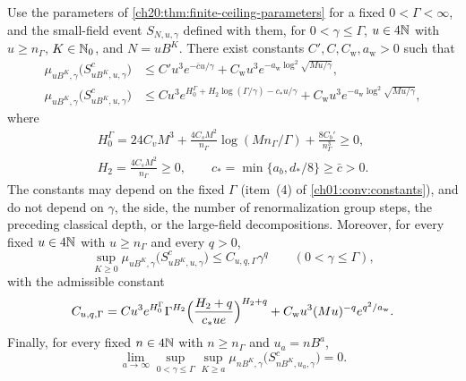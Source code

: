 \begin{theorem}\label{ch20:thm:finite-ceiling-payment}
Use the parameters of \cref{ch20:thm:finite-ceiling-parameters} for a fixed $0<\Gamma<\infty$, and the small-field event $S_{N,u,\gamma}$ defined with them, for $0<\gamma\le\Gamma$, $u\in4\mathbb N$ with $u\ge n_\Gamma$, $K\in\mathbb N_0$, and $N=uB^K$. There exist constants $C',C,C_{\mathrm w},a_{\mathrm w}>0$ such that
\begin{align}
 \mu_{uB^K,\gamma}\bigl(S_{uB^K,u,\gamma}^c\bigr)
 &\le C'u^3e^{-\bar cu/\gamma}+C_{\mathrm w}u^3e^{-a_{\mathrm w}\log^2\sqrt{Mu/\gamma}},
 \label{ch20:eq:finite-ceiling-absorbed}\\
 \mu_{uB^K,\gamma}\bigl(S_{uB^K,u,\gamma}^c\bigr)
 &\le Cu^3e^{H_0^\Gamma+H_2\log(\Gamma/\gamma)-c_*u/\gamma}+C_{\mathrm w}u^3e^{-a_{\mathrm w}\log^2\sqrt{Mu/\gamma}},
 \label{ch20:eq:finite-ceiling-unabsorbed}
\end{align}
where
\[
 \begin{gathered}
 H_0^\Gamma=24C_vM^3+\frac{4C_sM^2}{n_\Gamma}\log(Mn_\Gamma/\Gamma)+\frac{8C_b'}{n_\Gamma^3}\ge0,\\
 H_2=\frac{4C_sM^2}{n_\Gamma}\ge0,\qquad c_*=\min\{a_b,d_*/8\}\ge\bar c>0.
 \end{gathered}
\]
The constants may depend on the fixed $\Gamma$ (item~\textup{(4)} of \cref{ch01:conv:constants}), and do not depend on $\gamma$, the side, the number of renormalization group steps, the preceding classical depth, or the large-field decompositions. Moreover, for every fixed $u\in4\mathbb N$ with $u\ge n_\Gamma$ and every $q>0$,
\[
 \sup_{K\ge0}\mu_{uB^K,\gamma}\bigl(S_{uB^K,u,\gamma}^c\bigr)\le C_{u,q,\Gamma}\gamma^q\qquad(0<\gamma\le\Gamma),
\]
with the admissible constant
\[
 C_{u,q,\Gamma}=Cu^3e^{H_0^\Gamma}\Gamma^{H_2}\Bigl(\frac{H_2+q}{c_*ue}\Bigr)^{H_2+q}+C_{\mathrm w}u^3(Mu)^{-q}e^{q^2/a_{\mathrm w}}.
\]
Finally, for every fixed $n\in4\mathbb N$ with $n\ge n_\Gamma$ and $u_a=nB^a$,
\[
 \lim_{a\to\infty}\sup_{0<\gamma\le\Gamma}\sup_{K\ge a}\mu_{nB^K,\gamma}\bigl(S_{nB^K,u_a,\gamma}^c\bigr)=0.
\]
\end{theorem}

